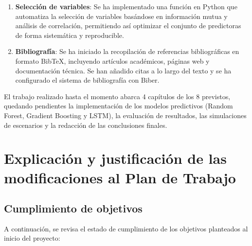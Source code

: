 \begin{enumerate}
    \item \textbf{Selección de variables}: Se ha implementado una función en Python que automatiza la selección de variables basándose en información mutua y análisis de correlación, permitiendo así optimizar el conjunto de predictoras de forma sistemática y reproducible.
    
    \item \textbf{Bibliografía}: Se ha iniciado la recopilación de referencias bibliográficas en formato BibTeX, incluyendo artículos académicos, páginas web y documentación técnica. Se han añadido citas a lo largo del texto y se ha configurado el sistema de bibliografía con Biber.
\end{enumerate}

El trabajo realizado hasta el momento abarca 4 capítulos de los 8 previstos, quedando pendientes la implementación de los modelos predictivos (Random Forest, Gradient Boosting y LSTM), la evaluación de resultados, las simulaciones de escenarios y la redacción de las conclusiones finales.

\section{Explicación y justificación de las modificaciones al Plan de Trabajo}

\subsection{Cumplimiento de objetivos}

A continuación, se revisa el estado de cumplimiento de los objetivos planteados al inicio del proyecto:

